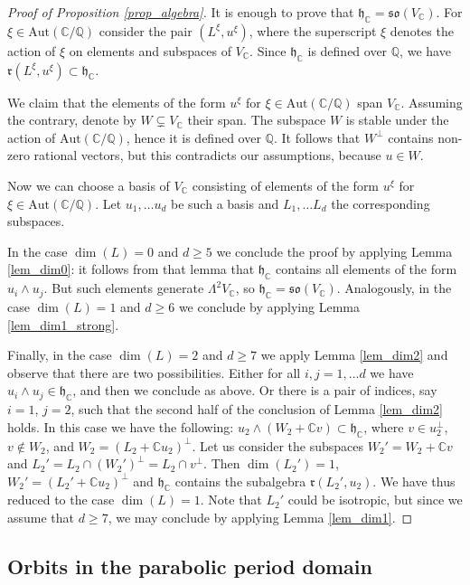 \documentclass[11pt]{article}
\newcommand{\6}{\partial}
\newcommand{\bbQ}{\mathbb{Q}}
\newcommand{\bbC}{\mathbb{C}}
\newcommand{\frh}{\mathfrak{h}}
\newcommand{\frr}{\mathfrak{r}}
\newcommand{\frso}{\mathfrak{so}}
\renewcommand{\ge}{\geqslant}
\newcommand{\wdg}{\wedge}
\newcommand{\Aut}{\mathrm{Aut}}
\begin{document}
\begin{proof}[Proof of Proposition \ref{prop_algebra}]%

It is enough to prove that $\frh_\bbC = \frso(V_\bbC)$. For $\xi\in \Aut(\bbC/\bbQ)$
consider the pair $(L^\xi, u^\xi)$, where the superscript $\xi$ denotes
the action of $\xi$ on elements and subspaces of $V_\bbC$. Since $\frh_\bbC$
is defined over $\bbQ$, we have $\frr(L^\xi,u^\xi)\subset \frh_\bbC$.

We claim that the elements of the form $u^\xi$ for $\xi\in \Aut(\bbC/\bbQ)$
span $V_\bbC$. Assuming the contrary, denote by $W\subsetneq V_\bbC$ their span.
The subspace $W$ is stable under the action of $\Aut(\bbC/\bbQ)$, hence it is defined
over $\bbQ$. It follows that $W^\perp$ contains non-zero rational vectors, but
this contradicts our assumptions, because $u\in W$.

Now we can choose a basis of $V_\bbC$ consisting of elements of the form
$u^\xi$ for $\xi\in \Aut(\bbC/\bbQ)$. Let $u_1,\ldots u_d$ be such a basis
and $L_1,\ldots L_d$ the corresponding subspaces.

In the case $\dim(L) = 0$ and $d\ge 5$ we conclude the proof by applying Lemma \ref{lem_dim0}:
it follows from that lemma that $\frh_\bbC$ contains all elements of the form
$u_i\wdg u_j$. But such elements generate $\Lambda^2 V_\bbC$, so $\frh_\bbC = \frso(V_\bbC)$.
Analogously, in the case $\dim(L) = 1$ and $d\ge 6$ we conclude by applying Lemma \ref{lem_dim1_strong}.

Finally, in the case $\dim(L) = 2$ and $d\ge 7$ we apply Lemma \ref{lem_dim2} and observe that there
are two possibilities. Either for all $i,j=1,\ldots d$ we have $u_i\wdg u_j\in \frh_\bbC$,
and then we conclude as above. Or there is a pair of indices, say $i=1$, $j=2$, such that
the second half of the conclusion of Lemma \ref{lem_dim2} holds. In this case 
we have the following: $u_2\wdg (W_2+\bbC v)\subset \frh_\bbC$, where $v\in u_2^\perp$,
$v\notin W_2$, and $W_2 = (L_2+ \bbC u_2)^\perp$. Let us consider the
subspaces $W_2' = W_2 + \bbC v$ and $L_2' = L_2 \cap (W_2')^\perp = L_2\cap v^\perp$. Then $\dim(L_2') = 1$,
$W_2' = (L_2' + \bbC u_2)^\perp$ and $\frh_\bbC$ contains the subalgebra $\frr(L_2', u_2)$.
We have thus reduced to the case $\dim(L) = 1$. Note that $L_2'$ could be isotropic,
but since we assume that $d\ge 7$, we may conclude by applying Lemma \ref{lem_dim1}.
\end{proof}

\subsection{Orbits in the parabolic period domain}\label{sec_orbitsDomP}
\end{document}
